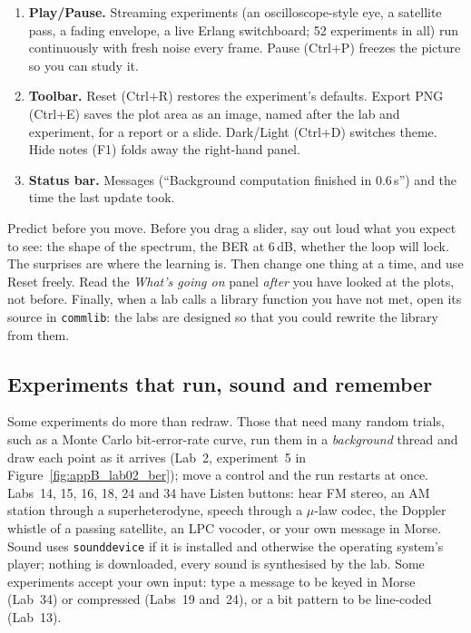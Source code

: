\begin{enumerate}[leftmargin=1.6em,itemsep=3pt,label=\textbf{\arabic*}]
is exact in every browser and in SumatraPDF or Adobe Reader; other viewers open at the start and the
status bar names the page).
\item \textbf{Play/Pause.} Streaming experiments (an oscilloscope-style eye, a satellite pass, a
fading envelope, a live Erlang switchboard; 52 experiments in all) run continuously with fresh
noise every frame. Pause (Ctrl+P) freezes the picture so you can study it.
\item \textbf{Toolbar.} \textsf{Reset} (Ctrl+R) restores the experiment's defaults. \textsf{Export PNG}
(Ctrl+E) saves the plot area as an image, named after the lab and experiment, for a report or a
slide. \textsf{Dark}/\textsf{Light} (Ctrl+D) switches theme. \textsf{Hide notes} (F1) folds away the
right-hand panel.
\item \textbf{Status bar.} Messages (``Background computation finished in 0.6\,s'') and the time the
last update took.
\end{enumerate}

\begin{inpractice}
Predict before you move. Before you drag a slider, say out loud what you expect to see: the shape
of the spectrum, the BER at 6\,dB, whether the loop will lock. The surprises are where the learning
is. Then change one thing at a time, and use \textsf{Reset} freely. Read the \emph{What's going on}
panel \emph{after} you have looked at the plots, not before. Finally, when a lab calls a library
function you have not met, open its source in \texttt{commlib}: the labs are designed so that you
could rewrite the library from them.
\end{inpractice}

\subsection{Experiments that run, sound and remember}

Some experiments do more than redraw. Those that need many random trials, such as a Monte Carlo
bit-error-rate curve, run them in a \emph{background} thread and draw each point as it arrives
(Lab~2, experiment~5 in Figure~\ref{fig:appB_lab02_ber}); move a control and the run restarts at once.
Labs~14, 15, 16, 18, 24 and 34 have \textsf{Listen} buttons: hear FM stereo, an AM station through
a superheterodyne, speech through a $\mu$-law codec, the Doppler whistle of a passing satellite, an
LPC vocoder, or your own message in Morse. Sound uses \texttt{sounddevice} if it is installed and
otherwise the operating system's player; nothing is downloaded, every sound is synthesised by the
lab. Some experiments accept your own input: type a message to be keyed in Morse (Lab~34) or
compressed (Labs~19 and~24), or a bit pattern to be line-coded (Lab~13).

